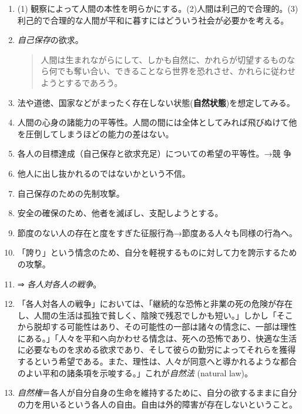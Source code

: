 \documentclass[uplatex,dvipdfmx]{jsarticle} \usepackage{mystyle}%
\begin{document}
 \begin{enumerate}

 \item (1) 観察によって人間の本性を明らかにする。(2)人間は利己的で合理的。(3)利己的で合理的な人間が平和に暮すにはどういう社会が必要かを考える。

  \item \emph{自己保存}の欲求。

  \begin{quote}
    人間は生まれながらにして、しかも自然に、かれらが切望するものなら何でも奪い合い、できることなら世界を恐れさせ、かれらに従わせようとするであろう。
  \end{quote}

\item 法や道徳、国家などがまったく存在しない状態({\bf 自然状態})を想定してみる。

\item 人間の心身の諸能力の平等性。人間の間には全体としてみれば飛びぬけて他を圧倒してしまうほどの能力の差はない。

\item 各人の目標達成（自己保存と欲求充足）についての希望の平等性。→競
  争

\item 他人に出し抜かれるのではないかという不信。

\item 自己保存のための先制攻撃。
\item 安全の確保のため、他者を滅ぼし、支配しようとする。
\item 節度のない人の存在と度をすぎた征服行為→節度ある人々も同様の行為へ。
\item 「誇り」という情念のため、自分を軽視するものに対して力を誇示するための攻撃。

    \item ⇒ \emph{各人対各人の戦争}。


    \item 「各人対各人の戦争」においては、「継続的な恐怖と非業の死の危険が存在し、人間の生活は孤独で貧しく、陰険で残忍でしかも短い。」しかし「そこから脱却する可能性はあり、その可能性の一部は諸々の情念に、一部は理性にある。」「人々を平和へ向かわせる情念は、死への恐怖であり、快適な生活に必要なものを求める欲求であり、そして彼らの勤労によってそれらを獲得するという希望である。また、理性は、人々が同意へと導かれるような都合のよい平和の諸条項を示唆する。」これが\emph{自然法} (natural law)。

    \item \emph{自然権}＝各人が自分自身の生命を維持するために、自分の欲するままに自分の力を用いるという各人の自由。自由は外的障害が存在しないということ。


\end{enumerate}
\end{document}
